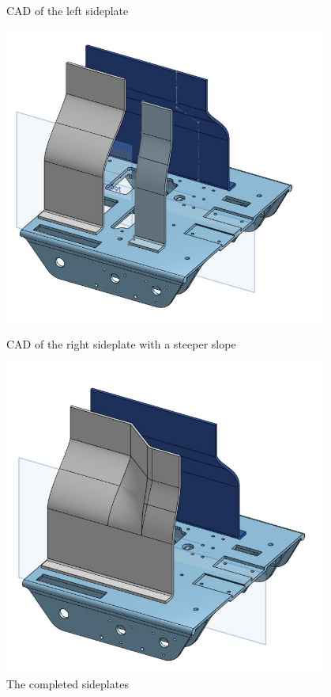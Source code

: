 \begin{figure}[ht]
\begin{minipage}[b]{.48\textwidth}
  \caption{CAD of the left sideplate}
  \label{fig:112621_4}
\end{minipage}
\end{figure}

\begin{figure}[ht]
\centering
\begin{minipage}[b]{.48\textwidth}
  \centering
  \includegraphics[width=0.95\textwidth]{Meetings/November/11-26-21/11-26-21_CAD_Figure5 - Nathan Forrer.JPG}
  \caption{CAD of the right sideplate with a steeper slope}
  \label{fig:112621_5}
\end{minipage}%
\hfill%
\begin{minipage}[b]{.48\textwidth}
  \centering
  \includegraphics[width=0.95\textwidth]{Meetings/November/11-26-21/11-26-21_CAD_Figure6 - Nathan Forrer.JPG}
  \caption{The completed sideplates}
  \label{fig:112621_6}
\end{minipage}
\end{figure}



